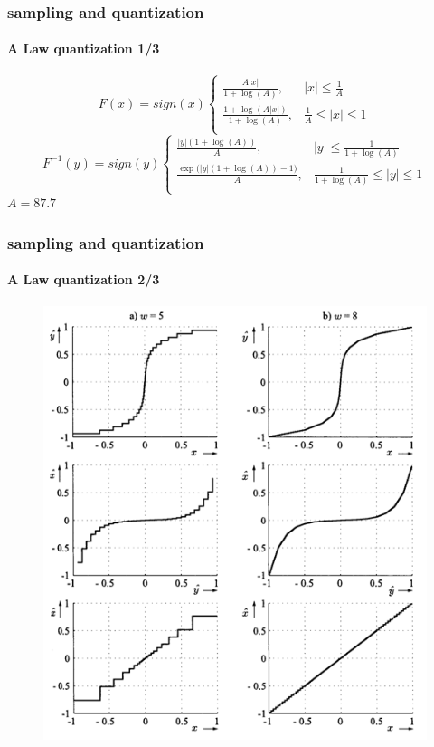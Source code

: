 	\begin{frame}\frametitle{sampling and quantization}\framesubtitle{A Law quantization 1/3}
		\begin{equation}
			F(x)	= sign(x)\left\lbrace
					\begin{array}{ll} 
			          \frac{A|x|}{1+\log(A)}, & |x| \leq \frac{1}{A}\\ 
			          \frac{1+\log(A|x|)}{1+\log(A)}, & \frac{1}{A} \leq |x| \leq 1\\ 
          			\end{array} 
          			\right.
		\end{equation}
		\begin{equation}
			F^{-1}(y)	= sign(y)\left\lbrace
					\begin{array}{ll} 
			          \frac{|y|(1+\log(A))}{A}, & |y| \leq \frac{1}{1+\log(A)}\\ 
			          \frac{\exp\big(|y|(1+\log(A))-1\big)}{A}, & \frac{1}{1+\log(A)} \leq |y| \leq 1\\ 
          			\end{array} 
          			\right.
		\end{equation}
		$A = 87.7$
	\end{frame}	

	\begin{frame}\frametitle{sampling and quantization}\framesubtitle{A Law quantization 2/3}
	    \begin{figure}
			\centering
				\includegraphics[scale=0.5]{Graph/a-law}
		\end{figure}
	\end{frame}

